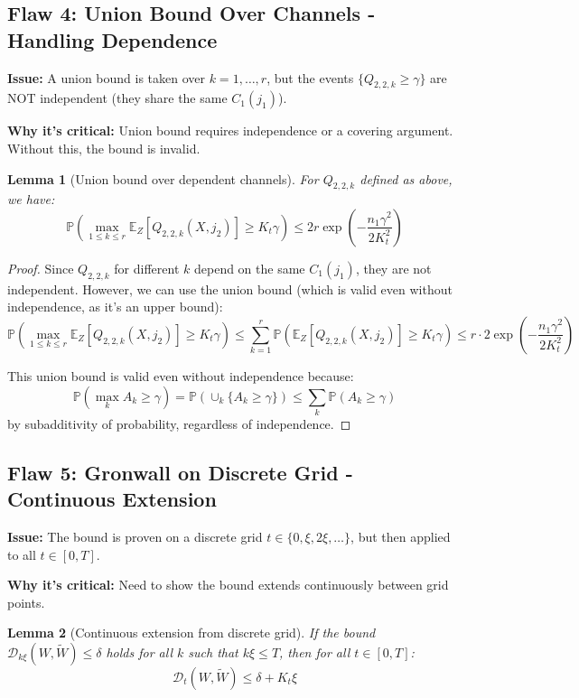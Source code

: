 \documentclass[11pt]{article}
\newcommand{\1}{\mathbbm{1}}
\newtheorem{lemma}{Lemma}
\begin{document}
\subsection{Flaw 4: Union Bound Over Channels - Handling Dependence}

\textbf{Issue:} A union bound is taken over $k = 1, \ldots, r$, but the events $\{Q_{2,2,k} \ge \gamma\}$ are NOT independent (they share the same $C_1(j_1)$).

\textbf{Why it's critical:} Union bound requires independence or a covering argument. Without this, the bound is invalid.

\begin{lemma}[Union bound over dependent channels]
\label{lem:union-bound-channels}
For $Q_{2,2,k}$ defined as above, we have:
\[
\mathbb{P}\left(\max_{1 \le k \le r} \mathbb{E}_Z[Q_{2,2,k}(X, j_2)] \ge K_t\gamma\right) \le 2r\exp\left(-\frac{n_1\gamma^2}{2K_t^2}\right)
\]
\end{lemma}

\begin{proof}
Since $Q_{2,2,k}$ for different $k$ depend on the same $C_1(j_1)$, they are not independent. However, we can use the union bound (which is valid even without independence, as it's an upper bound):
\[
\mathbb{P}\left(\max_{1 \le k \le r} \mathbb{E}_Z[Q_{2,2,k}(X, j_2)] \ge K_t\gamma\right) \le \sum_{k=1}^r \mathbb{P}\left(\mathbb{E}_Z[Q_{2,2,k}(X, j_2)] \ge K_t\gamma\right) \le r \cdot 2\exp\left(-\frac{n_1\gamma^2}{2K_t^2}\right)
\]

This union bound is valid even without independence because:
\[
\mathbb{P}(\max_k A_k \ge \gamma) = \mathbb{P}(\cup_k \{A_k \ge \gamma\}) \le \sum_k \mathbb{P}(A_k \ge \gamma)
\]
by subadditivity of probability, regardless of independence.
\end{proof}

\subsection{Flaw 5: Gronwall on Discrete Grid - Continuous Extension}

\textbf{Issue:} The bound is proven on a discrete grid $t \in \{0, \xi, 2\xi, \ldots\}$, but then applied to all $t \in [0, T]$.

\textbf{Why it's critical:} Need to show the bound extends continuously between grid points.

\begin{lemma}[Continuous extension from discrete grid]
\label{lem:continuous-extension}
If the bound $\mathscr{D}_{k\xi}(W, \tilde{W}) \le \delta$ holds for all $k$ such that $k\xi \le T$, then for all $t \in [0, T]$:
\[
\mathscr{D}_t(W, \tilde{W}) \le \delta + K_t\xi
\]
\end{lemma}
\end{document}
